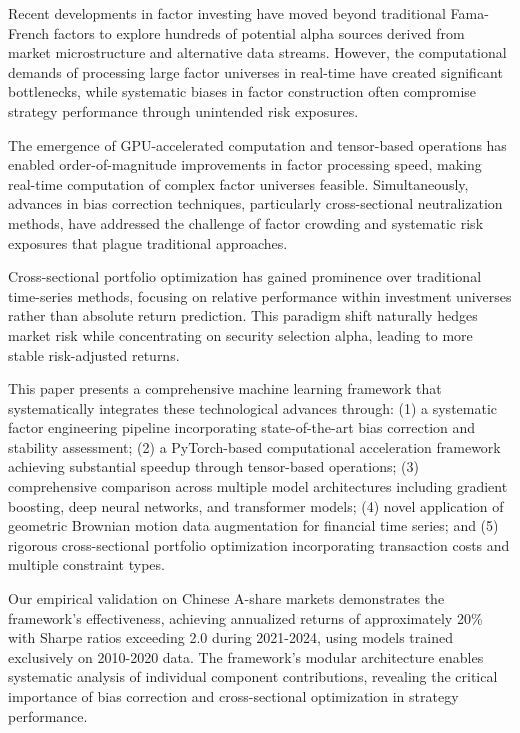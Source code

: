 \documentclass[conference]{IEEEtran}
\begin{document}
Recent developments in factor investing have moved beyond traditional Fama-French factors to explore hundreds of potential alpha sources derived from market microstructure and alternative data streams. However, the computational demands of processing large factor universes in real-time have created significant bottlenecks, while systematic biases in factor construction often compromise strategy performance through unintended risk exposures.

The emergence of GPU-accelerated computation and tensor-based operations has enabled order-of-magnitude improvements in factor processing speed, making real-time computation of complex factor universes feasible. Simultaneously, advances in bias correction techniques, particularly cross-sectional neutralization methods, have addressed the challenge of factor crowding and systematic risk exposures that plague traditional approaches.

Cross-sectional portfolio optimization has gained prominence over traditional time-series methods, focusing on relative performance within investment universes rather than absolute return prediction. This paradigm shift naturally hedges market risk while concentrating on security selection alpha, leading to more stable risk-adjusted returns.

This paper presents a comprehensive machine learning framework that systematically integrates these technological advances through: (1) a systematic factor engineering pipeline incorporating state-of-the-art bias correction and stability assessment; (2) a PyTorch-based computational acceleration framework achieving substantial speedup through tensor-based operations; (3) comprehensive comparison across multiple model architectures including gradient boosting, deep neural networks, and transformer models; (4) novel application of geometric Brownian motion data augmentation for financial time series; and (5) rigorous cross-sectional portfolio optimization incorporating transaction costs and multiple constraint types.

Our empirical validation on Chinese A-share markets demonstrates the framework's effectiveness, achieving annualized returns of approximately 20\% with Sharpe ratios exceeding 2.0 during 2021-2024, using models trained exclusively on 2010-2020 data. The framework's modular architecture enables systematic analysis of individual component contributions, revealing the critical importance of bias correction and cross-sectional optimization in strategy performance.
\end{document}
